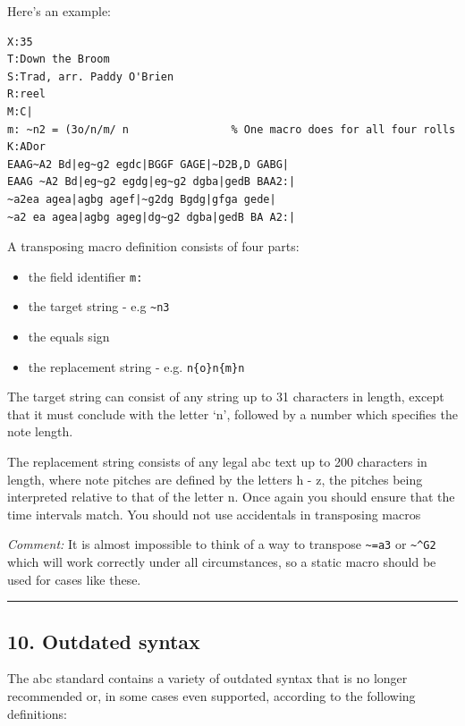 \documentclass[oneside]{book}
\begin{document}
Here's an example:

\begin{verbatim}
X:35
T:Down the Broom
S:Trad, arr. Paddy O'Brien
R:reel
M:C|
m: ~n2 = (3o/n/m/ n                % One macro does for all four rolls
K:ADor
EAAG~A2 Bd|eg~g2 egdc|BGGF GAGE|~D2B,D GABG|
EAAG ~A2 Bd|eg~g2 egdg|eg~g2 dgba|gedB BAA2:|
~a2ea agea|agbg agef|~g2dg Bgdg|gfga gede|
~a2 ea agea|agbg ageg|dg~g2 dgba|gedB BA A2:|
\end{verbatim}

A transposing macro definition consists of four parts:

\begin{itemize}
\item
  the field identifier \texttt{m:}
\item
  the target string - e.g \texttt{\textasciitilde{}n3}
\item
  the equals sign
\item
  the replacement string - e.g. \texttt{n\{o\}n\{m\}n}
\end{itemize}

The target string can consist of any string up to 31 characters in
length, except that it must conclude with the letter `n', followed by a
number which specifies the note length.

The replacement string consists of any legal abc text up to 200
characters in length, where note pitches are defined by the letters h -
z, the pitches being interpreted relative to that of the letter n. Once
again you should ensure that the time intervals match. You should not
use accidentals in transposing macros

\emph{Comment:} It is almost impossible to think of a way to transpose
\texttt{\textasciitilde{}=a3} or \texttt{\textasciitilde{}\^{}G2} which
will work correctly under all circumstances, so a static macro should be
used for cases like these.

\begin{center}\rule{0.5\linewidth}{\linethickness}\end{center}

\hypertarget{outdated_syntax}{\subsection{10. Outdated
syntax}\label{outdated_syntax}}

The abc standard contains a variety of outdated syntax that is no longer
recommended or, in some cases even supported, according to the following
definitions:
\end{document}
